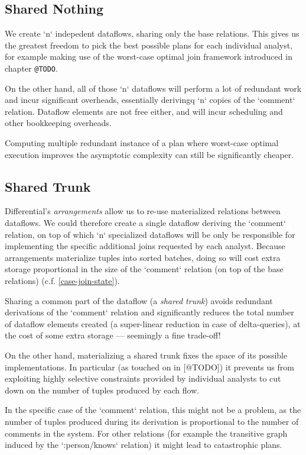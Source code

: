 \documentclass[../catalog.tex]{subfiles}
\begin{document}
\subsection{Shared Nothing}

We create `n` indepedent dataflows, sharing only the base
relations. This gives us the greatest freedom to pick the best
possible plans for each individual analyst, for example making use of
the worst-case optimal join framework introduced in chapter \texttt{@TODO}.

On the other hand, all of those `n` dataflows will perform a lot of
redundant work and incur significant overheads, essentially
derivingq `n` copies of the `comment` relation. Dataflow elements
are not free either, and will incur scheduling and other bookkeeping
overheads.

Computing multiple redundant instance of a plan where worst-case
optimal execution improves the asymptotic complexity can still be
significantly cheaper.

\subsection{Shared Trunk}

Differential's \emph{arrangements} allow us to re-use materialized
relations between dataflows. We could therefore create a single
dataflow deriving the `comment` relation, on top of which `n`
specialized dataflows will be only be responsible for implementing the
specific additional joins requested by each analyst. Because
arrangements materialize tuples into sorted batches, doing so will
cost extra storage proportional in the size of the `comment` relation
(on top of the base relations) (c.f. \ref{case-join-state}).

Sharing a common part of the dataflow (a \emph{shared trunk}) avoids
redundant derivations of the `comment` relation and significantly
reduces the total number of dataflow elements created (a super-linear
reduction in case of delta-queries), at the cost of some extra storage
— seemingly a fine trade-off!

On the other hand, materializing a shared trunk fixes the space of its
possible implementations. In particular (as touched on in [@TODO]) it
prevents us from exploiting highly selective constraints provided by
individual analysts to cut down on the number of tuples produced by
each flow.

In the specific case of the `comment` relation, this might not be a
problem, as the number of tuples produced during its derivation is
proportional to the number of comments in the system. For other
relations (for example the transitive graph induced by the
`:person/knows` relation) it might lead to catastrophic plans.
\end{document}
